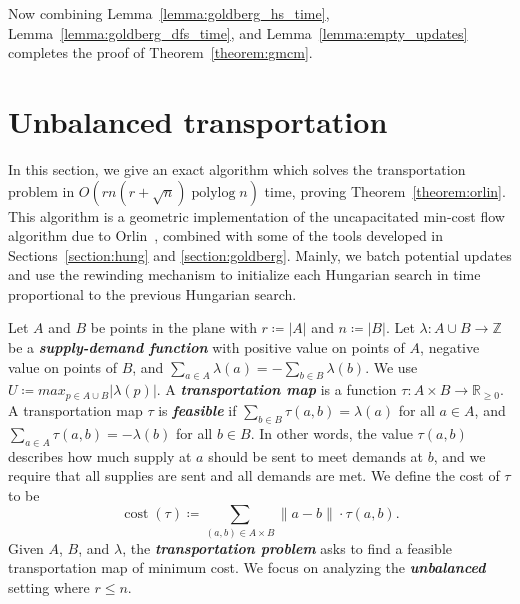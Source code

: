 \documentclass[a4paper,UKenglish]{socg-lipics-v2018}
\def\polylog{\mathop{\mathrm{polylog}}}
\def\reals{\mathbb{R}}
\def\ints{\mathbb{Z}}
\def\abs#1{\mathopen| #1 \mathclose|}		%
\def\norm#1{\mathopen\| #1 \mathclose\|}	%
\def\tsupply{\lambda}
\def\cost{\operatorname{cost}}
\theoremstyle{plain}
\numberwithin{figure}{section}
\def\EMPH#1{\textbf{\emph{\boldmath #1}}}
\begin{document}
%
Now combining Lemma~\ref{lemma:goldberg_hs_time}, Lemma~\ref{lemma:goldberg_dfs_time}, and
Lemma~\ref{lemma:empty_updates}
completes the proof of Theorem~\ref{theorem:gmcm}.





\section{Unbalanced transportation}


In this section, we give an exact algorithm which solves the transportation
problem in $O(rn(r + \sqrt{n})\polylog n)$ time, proving
Theorem~\ref{theorem:orlin}.
This algorithm is a geometric implementation of the uncapacitated min-cost flow
algorithm due to Orlin~\cite{O93}, combined with some of the tools developed
in Sections~\ref{section:hung} and \ref{section:goldberg}.
Mainly, we batch potential updates and use the rewinding mechanism to
initialize each Hungarian search in time proportional to the previous
Hungarian search.

Let $A$ and $B$ be points in the plane with $r \coloneqq \abs{A}$ and
$n \coloneqq \abs{B}$.
Let $\tsupply:A \cup B \to \ints$ be a \EMPH{supply-demand function} with
positive value on points of $A$, negative value on points of $B$, and
$\sum_{a \in A} \tsupply(a) = - \sum_{b \in B} \tsupply(b)$.
We use $U \coloneqq max_{p \in A \cup B} \abs{\tsupply(p)}$.
A \EMPH{transportation map} is a function
$\tau: A \times B \to \reals_{\geq 0}$.
A transportation map $\tau$ is \EMPH{feasible} if
$\sum_{b \in B} \tau(a, b) = \tsupply(a)$ for all $a \in A$, and
$\sum_{a \in A} \tau(a, b) = -\tsupply(b)$ for all $b \in B$.
In other words, the value $\tau(a, b)$ describes how much supply at $a$ should
be sent to meet demands at $b$, and we require that all supplies are sent
and all demands are met.
We define the cost of $\tau$ to be
\[
	\cost(\tau) \coloneqq \sum_{(a, b) \in A \times B} \norm{a-b} \cdot \tau(a, b).
\]
Given $A$, $B$, and $\tsupply$, the \EMPH{transportation problem} asks to find
a feasible transportation map of minimum cost.
We focus on analyzing the \EMPH{unbalanced} setting where $r \leq n$.
\end{document}
